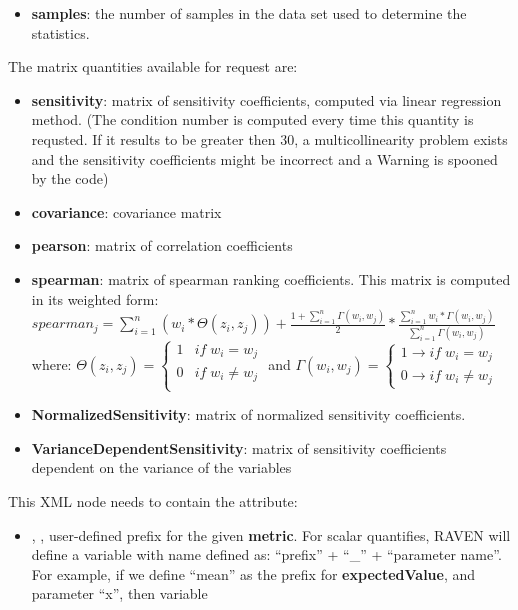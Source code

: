 \begin{itemize}
\begin{itemize}
    \item \textbf{samples}: the number of samples in the data set used to determine the statistics.
  \end{itemize}
  The matrix quantities available for request are:
  \begin{itemize}
    \item \textbf{sensitivity}: matrix of sensitivity coefficients, computed via linear regression method. (\nb The condition number is computed every time this quantity is requsted. If it results
    to be greater then $30$, a multicollinearity problem exists and the sensitivity coefficients
    might be incorrect and a Warning is spooned by the code)
    \item \textbf{covariance}: covariance matrix
    \item \textbf{pearson}: matrix of correlation coefficients
    \item \textbf{spearman}: matrix of spearman ranking coefficients. This matrix is computed in its
    weighted form:
    $spearman_j = \sum_{i=1}^n (w_i *\Theta(z_i, z_j)) + \frac{1+\sum_{i=1}^{n}  \Gamma(w_i, w_j)} {2} * \frac{\sum_{i=1}^{n} w_i*\Gamma(w_i, w_j)}{\sum_{i=1}^{n} \Gamma(w_i, w_j)}$
    where: $\Theta (z_i, z_j)=\left\{\begin{matrix}
1 & if \; w_i = w_j  \\
 0 & if \; w_i \neq w_j \\
\end{matrix}\right.$
    and $\Gamma (w_i, w_j) =\begin{cases}1 \rightarrow if \;  w_i = w_j \\ 0  \rightarrow if \; w_i \neq  w_j\end{cases}$
    \item \textbf{NormalizedSensitivity}: matrix of normalized sensitivity
    coefficients. 
    \item \textbf{VarianceDependentSensitivity}: matrix of sensitivity coefficients dependent on the variance of the variables
  \end{itemize}
  This XML node needs to contain the attribute:
  \begin{itemize}
    \itemsep0em
    \item {}, , user-defined prefix for the given \textbf{metric}.
      For scalar quantifies, RAVEN will define a variable with name defined as:  ``prefix'' + ``\_'' + ``parameter name''.
      For example, if we define ``mean'' as the prefix for \textbf{expectedValue}, and parameter ``x'', then variable

\end{itemize}
\end{itemize}
